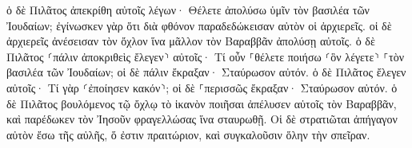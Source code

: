 \documentclass{openreader}
\begin{document}
ὁ δὲ Πιλᾶτος ἀπεκρίθη αὐτοῖς λέγων· Θέλετε ἀπολύσω ὑμῖν τὸν βασιλέα τῶν Ἰουδαίων; 
ἐγίνωσκεν γὰρ ὅτι διὰ φθόνον παραδεδώκεισαν αὐτὸν οἱ ἀρχιερεῖς. 
οἱ δὲ ἀρχιερεῖς ἀνέσεισαν τὸν ὄχλον ἵνα μᾶλλον τὸν Βαραββᾶν ἀπολύσῃ αὐτοῖς. 
ὁ δὲ Πιλᾶτος ⸂πάλιν ἀποκριθεὶς ἔλεγεν⸃ αὐτοῖς· Τί οὖν ⸀θέλετε ποιήσω ⸂ὃν λέγετε⸃ ⸀τὸν βασιλέα τῶν Ἰουδαίων; 
οἱ δὲ πάλιν ἔκραξαν· Σταύρωσον αὐτόν. 
ὁ δὲ Πιλᾶτος ἔλεγεν αὐτοῖς· Τί γὰρ ⸂ἐποίησεν κακόν⸃; οἱ δὲ ⸀περισσῶς ἔκραξαν· Σταύρωσον αὐτόν. 
ὁ δὲ Πιλᾶτος βουλόμενος τῷ ὄχλῳ τὸ ἱκανὸν ποιῆσαι ἀπέλυσεν αὐτοῖς τὸν Βαραββᾶν, καὶ παρέδωκεν τὸν Ἰησοῦν φραγελλώσας ἵνα σταυρωθῇ. 
Οἱ δὲ στρατιῶται ἀπήγαγον αὐτὸν ἔσω τῆς αὐλῆς, ὅ ἐστιν πραιτώριον, καὶ συγκαλοῦσιν ὅλην τὴν σπεῖραν. 
\end{document}
